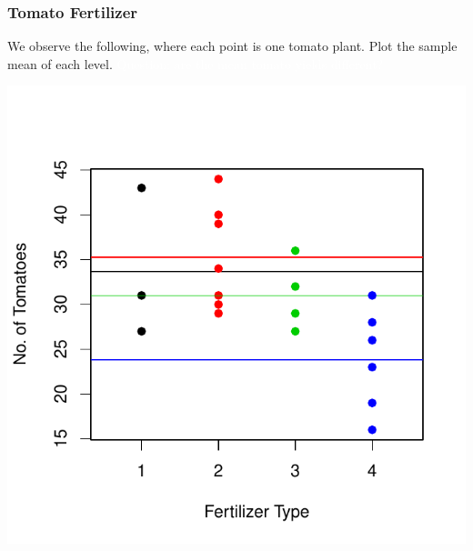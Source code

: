 \documentclass[handout]{beamer}
\begin{document}
\addtocounter{framenumber}{-1}
\begin{frame}
\frametitle{Tomato Fertilizer}
We observe the following, where each point is one tomato plant.  Plot the sample mean of each level. \textcolor{white}{Question:  are the mean tomato yields different?} 
\begin{center}
\includegraphics{figure/lec22-004}
\end{center}
\end{frame}
\end{document}
